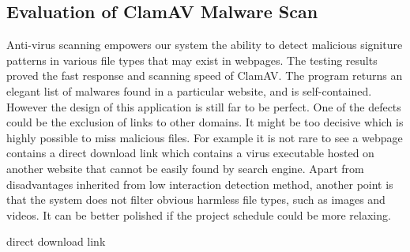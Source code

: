 \subsection{Evaluation of ClamAV Malware Scan}
Anti-virus scanning empowers our system the ability to detect malicious 
signiture patterns in various file types that may exist in webpages. The 
testing results proved the fast response and scanning speed of ClamAV. The 
program returns an elegant list of malwares found in a particular website, and 
is self-contained. \\
However the design of this application is still far to be perfect. One of the 
defects could be the exclusion of links to other domains. It might be too 
decisive which is highly possible to miss malicious files.  For example it is 
not rare to see a webpage contains a direct download link which contains a
virus executable hosted on another website that cannot be easily found by 
search engine. Apart from disadvantages inherited from low interaction 
detection method, another point is that the system does not filter obvious 
harmless file types, such as images and videos. It can be better polished if 
the project schedule could be more relaxing. 




direct download link 
